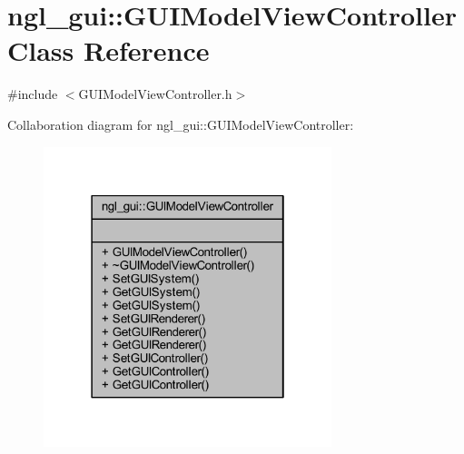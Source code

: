 \hypertarget{classngl__gui_1_1_g_u_i_model_view_controller}{}\section{ngl\+\_\+gui\+:\+:G\+U\+I\+Model\+View\+Controller Class Reference}
\label{classngl__gui_1_1_g_u_i_model_view_controller}


{\ttfamily \#include $<$G\+U\+I\+Model\+View\+Controller.\+h$>$}



Collaboration diagram for ngl\+\_\+gui\+:\+:G\+U\+I\+Model\+View\+Controller\+:\nopagebreak
\begin{figure}[H]
\begin{center}
\leavevmode
\includegraphics[width=238pt]{classngl__gui_1_1_g_u_i_model_view_controller__coll__graph}
\end{center}
\end{figure}
